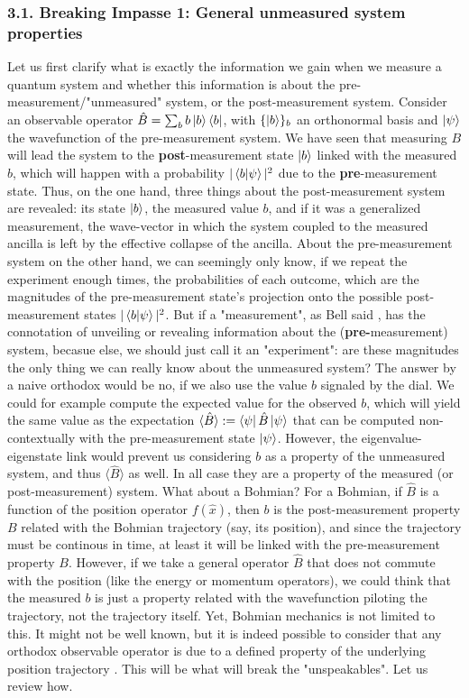 \documentclass[11pt, a4paper]{article} %
\begin{document}
\subsubsection*{3.1. Breaking Impasse 1: General unmeasured system properties }\vspace{-0.15cm}

Let us first clarify what is exactly the information we gain when we measure a quantum system and whether this information is about the pre-measurement/"unmeasured" system, or the post-measurement system. Consider an observable operator $\hat{B}=\sum_b b\ket{b}\bra{b}$, with $\{\ket{b}\}_b$ an orthonormal basis and $\ket{\psi}$ the wavefunction of the pre-measurement system. We have seen that measuring $B$ will lead the system to the {\bf post}-measurement state $\ket{b}$ linked with the measured $b$, which will happen with a probability $|\bra{b}\ket{\psi}|^2$ due to the {\bf pre}-measurement state. Thus, on the one hand, three things about the post-measurement system are revealed: its state $\ket{b}$, the measured value $b$, and if it was a generalized measurement, the wave-vector in which the system coupled to the measured ancilla is left by the effective collapse of the ancilla. About the pre-measurement system on the other hand, we can seemingly only know, if we repeat the experiment enough times, the probabilities of each outcome, which are the magnitudes of the pre-measurement state's projection onto the possible post-measurement states $|\bra{b}\ket{\psi}|^2$. But if a "measurement", as Bell said \cite{Bell}, has the connotation of unveiling or revealing information about the ({\bf pre-}measurement) system, becasue else, we should just call it an "experiment": are these magnitudes the only thing we can really know about the unmeasured system? The answer by a naive orthodox would be no, if we also use the value $b$ signaled by the dial. We could for example compute the expected value for the observed $b$, which will yield the same value as the expectation $\langle \hat{B} \rangle:=\bra{\psi} \hat{B} \ket{\psi}$ that can be computed non-contextually with the pre-measurement state $\ket{\psi}$. However, the eigenvalue-eigenstate link would prevent us considering $b$ as a property of the unmeasured system, and thus $\langle \hat{B} \rangle$ as well. In all case they are a property of the measured (or post-measurement) system. What about a Bohmian? For a Bohmian, if $\hat{B}$ is a function of the position operator $f(\hat{x})$, then $b$ is the post-measurement property $B$ related with the Bohmian trajectory (say, its position), and since the trajectory must be continous in time, at least it will be linked with the pre-measurement property $B$. However, if we take a general operator $\hat{B}$ that does not commute with the position (like the energy or momentum operators), we could think that the measured $b$ is just a property related with the wavefunction piloting the trajectory, not the trajectory itself. Yet, Bohmian mechanics is not limited to this. It might not be well known, but it is indeed possible to consider that any orthodox observable operator is due to a defined property of the underlying position trajectory \cite{DevInPosition1, DevInPosition2}. This will be what will break the "unspeakables". Let us review how.
\end{document}

